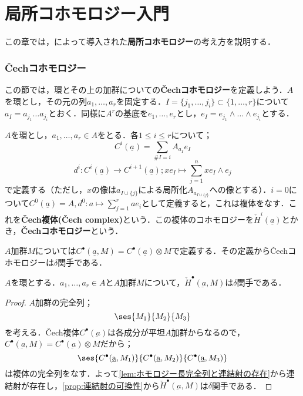 \part[Introduction of Local Cohomology]{局所コホモロジー入門}
この章では，\cite{Grothendieck1966}によって導入された\textbf{局所コホモロジー}の考え方を説明する．

\section{Čechコホモロジー}

この節では，環とその上の加群についての\textbf{Čechコホモロジー}を定義しよう．$A$を環とし，その元の列$a_1,\dots,a_r$を固定する．$I=\{j_1,\dots,j_i\}\subset\{1,\dots,r\}$について$a_I=a_{j_1}\dots a_{j_i}$とおく．同様に$A^r$の基底を$e_1,\dots,e_r$とし，$e_I=e_{j_1}\wedge\dots\wedge e_{j_i}$とする．

\begin{defi}[Čech複体]
	$A$を環とし，$a_1,\dots,a_r\in A$をとる．各$1\leq i\leq r$について；
	\[C^i(\underline{a})=\sum_{\# I=i}A_{a_I}e_I\]
	\[d^i:C^i(\underline{a})\to C^{i+1}(\underline{a});xe_I\mapsto\sum_{j=1}^n xe_I\wedge e_j\]
	で定義する（ただし，$x$の像は$a_{I\cup\{j\}}$による局所化$A_{a_{I\cup\{j\}}}$への像とする）．$i=0$について$C^0(\underline{a})=A,d^0:a\mapsto\sum_{j=1}^r ae_i$として定義すると，これは複体をなす．これを\textbf{Čech複体(Čech complex)}という．この複体のコホモロジーを$\check{H}^i(\underline{a})$とかき，\textbf{Čechコホモロジー}という．
\end{defi}

$A$加群$M$については$C^\bullet(\underline{a},M)=C^\bullet(\underline{a})\otimes M$で定義する．その定義から\v{C}echコホモロジーは$\delta$関手である．

\begin{prop}
	$A$を環とする．$a_1,\dots,a_r\in A$と$A$加群$M$について，$\check{H}^\bullet(\underbar{a},M)$は$\delta$関手である．
\end{prop}

\begin{proof}
	$A$加群の完全列；
	\[\ses{M_1}{M_2}{M_3}\]
	を考える．\v{C}ech複体$C^\bullet(\underbar{a})$は各成分が平坦$A$加群からなるので，$C^\bullet(\underbar{a},M)=C^\bullet(\underbar{a})\otimes M$だから；
	\[\ses{C^\bullet(\underbar{a},M_1)}{C^\bullet(\underbar{a},M_2)}{C^\bullet(\underbar{a},M_3)}\]
	は複体の完全列をなす．よって\ref{lem:ホモロジー長完全列と連結射の存在}から連結射が存在し，\ref{prop:連結射の可換性}から$\check{H}^\bullet(\underbar{a},M)$は$\delta$関手である．
\end{proof}

